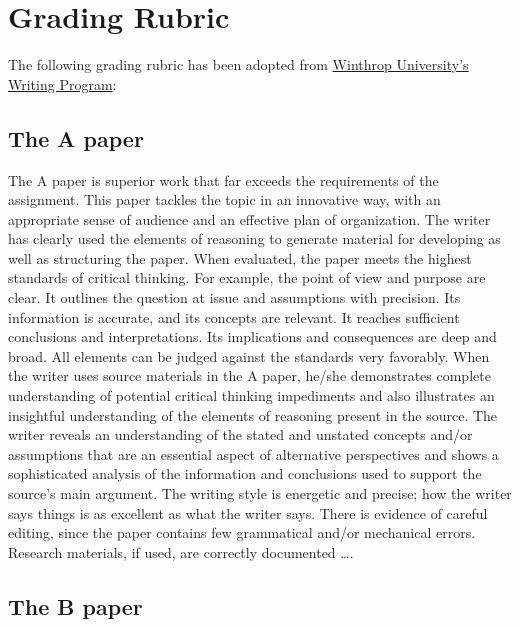 
\chapter{Grading Rubric}


The following grading rubric has been adopted from \href{http://www2.winthrop.edu/english/WritingProgram/rubric.htm}{Winthrop University's Writing Program}:

\section{The A paper}
The A paper is superior work that far exceeds the requirements of the assignment. This paper tackles the topic in an innovative way, with an appropriate sense of audience and an effective plan of organization. The writer has clearly used the elements of reasoning to generate material for developing as well as structuring the paper. When evaluated, the paper meets the highest standards of critical thinking. For example, the point of view and purpose are clear. It outlines the question at issue and assumptions with precision. Its information is accurate, and its concepts are relevant. It reaches sufficient conclusions and interpretations. Its implications and consequences are deep and broad. All elements can be judged against the standards very favorably. When the writer uses source materials in the A paper, he/she demonstrates complete understanding of potential critical thinking impediments and also illustrates an insightful understanding of the elements of reasoning present in the source. The writer reveals an understanding of the stated and unstated concepts and/or assumptions that are an essential aspect of alternative perspectives and shows a sophisticated analysis of the information and conclusions used to support the source’s main argument. The writing style is energetic and precise; how the writer says things is as excellent as what the writer says. There is evidence of careful editing, since the paper contains few grammatical and/or mechanical errors. Research materials, if used, are correctly documented \dots.

\section{The B paper}

